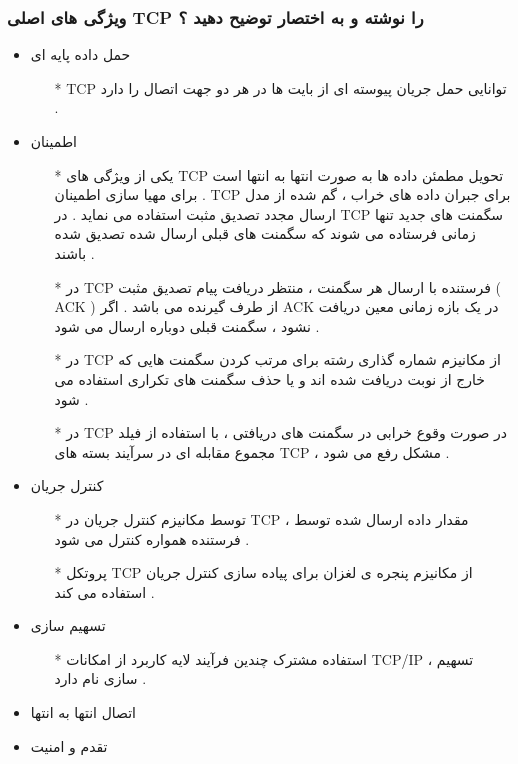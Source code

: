 \documentclass[12pt]{book}
\begin{document}
\subsubsection {
 ویژگی های اصلی TCP را نوشته و به اختصار توضیح دهید ؟
}

\begin{itemize}
	\item حمل داده پایه ای
	\begin{itemize}
		\item[*] TCP توانایی حمل جریان پیوسته ای از بایت ها در هر دو جهت اتصال را دارد .
	\end{itemize}
	\item اطمینان
	\begin{itemize}
		\item[*] یکی از ویژگی های TCP تحویل مطمئن داده ها
		به صورت انتها به انتها است . برای مهیا سازی اطمینان TCP برای جبران داده های خراب ، گم شده از مدل ارسال مجدد تصدیق مثبت استفاده می نماید . در TCP سگمنت های جدید تنها زمانی فرستاده می شوند که سگمنت های قبلی ارسال شده تصدیق شده باشند . 
		\item[*] در TCP 
		فرستنده با ارسال هر سگمنت ، منتظر دریافت پیام تصدیق مثبت ( ACK ) از طرف گیرنده می باشد . اگر ACK
		در یک بازه زمانی معین دریافت نشود ، سگمنت قبلی دوباره ارسال می شود .
		\item[*] در TCP
		از مکانیزم شماره گذاری رشته برای مرتب کردن سگمنت هایی که خارج از نوبت دریافت شده اند و یا حذف سگمنت های تکراری استفاده می شود .
		\item[*] در TCP
		در صورت وقوع خرابی در سگمنت های دریافتی ، با استفاده از فیلد مجموع مقابله ای در سرآیند بسته های TCP 
		، مشکل رفع می شود .
	\end{itemize}
	\item کنترل جریان
	\begin{itemize}
		\item[*] توسط مکانیزم کنترل جریان در TCP
		، مقدار داده ارسال شده توسط فرستنده همواره کنترل می شود .
		\item[*] پروتکل TCP از مکانیزم پنجره ی لغزان
		برای پیاده سازی کنترل جریان استفاده می کند .
	\end{itemize}
	\item تسهیم سازی
	\begin{itemize}
		\item[*] استفاده مشترک چندین فرآیند لایه کاربرد از امکانات TCP/IP ، 
		تسهیم سازی نام دارد .
	\end{itemize}
	\item اتصال انتها به انتها
	\item تقدم و امنیت
\end{itemize}
\end{document}
